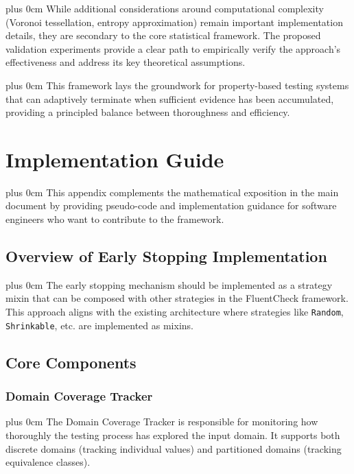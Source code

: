 \documentclass[conference]{IEEEtran}
\newcommand{\justifytext}{\leftskip=0pt \rightskip=0pt plus 0cm}
\begin{document}
\justifytext
While additional considerations around computational complexity (Voronoi tessellation, entropy approximation) remain important implementation details, they are secondary to the core statistical framework. The proposed validation experiments provide a clear path to empirically verify the approach's effectiveness and address its key theoretical assumptions.

\justifytext
This framework lays the groundwork for property-based testing systems that can adaptively terminate when sufficient evidence has been accumulated, providing a principled balance between thoroughness and efficiency.

\appendix

\section{Implementation Guide}
\label{sec:implementation-guide}

\justifytext
This appendix complements the mathematical exposition in the main document by providing pseudo-code and implementation guidance for software engineers who want to contribute to the framework.

\subsection{Overview of Early Stopping Implementation}

\justifytext
The early stopping mechanism should be implemented as a strategy mixin that can be composed with other strategies in the FluentCheck framework. This approach aligns with the existing architecture where strategies like \texttt{Random}, \texttt{Shrinkable}, etc. are implemented as mixins.

\subsection{Core Components}

\subsubsection{Domain Coverage Tracker}

\justifytext
The Domain Coverage Tracker is responsible for monitoring how thoroughly the testing process has explored the input domain. It supports both discrete domains (tracking individual values) and partitioned domains (tracking equivalence classes).
\end{document}

